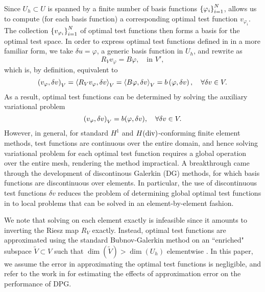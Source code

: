 Since $U_h \subset U$ is spanned by a finite number of basis functions $\LRc{\varphi_i}_{i=1}^N$,  allows us to compute (for each basis function) a corresponding optimal test function $v_{\varphi_i}$. The collection $\LRc{v_{\varphi_i}}_{i = 1}^N$ of optimal test functions then forms a basis for the optimal test space.  In order to express optimal test functions defined in  in a more familiar form, we take  $\delta u = \varphi$, a generic basis function in $U_h$, and rewrite  as
\[
R_Vv_{\varphi} = B\varphi, \quad \text{in } V',
\]
which is, by definition, equivalent to
\[
\LRp{v_\varphi,\delta v}_V = \LRa{R_Vv_\varphi,\delta v}_{V}=
\LRa{B\varphi, \delta v}_V = b\LRp{\varphi,\delta v}, \quad
\forall \delta v \in V.
\]
As a result, optimal test functions can be determined by solving the auxiliary
variational problem
\begin{equation}
\eqnlab{optvVar}
\left(v_\varphi,\delta v\right)_V = b(\varphi,\delta v), \quad \forall
\delta v \in V.
\end{equation}
However, in general, for standard $H^1$ and $H({\rm div})$-conforming finite element methods, test functions are continuous over the entire domain, and hence solving variational problem  for each optimal test function requires a global operation over the entire mesh, rendering the method impractical. A breakthrough came through the development of
discontinous Galerkin (DG) methods, for which basis functions are
discontinuous over elements. In particular, the use of discontinuous
test functions $\delta v$ reduces the problem of determining global 
optimal test functions
in  to local problems that can be solved in an
element-by-element fashion.

We note that solving  on each element exactly is
infeasible since it amounts to inverting the Riesz map $R_V$ exactly.
Instead, optimal test functions are approximated using the standard
Bubnov-Galerkin method on an ``enriched" subspace $\tilde{V} \subset
V$ such that $\dim(\tilde{V}) > \dim(U_h)$ elementwise \cite{DPG1, DPG2}. In this
paper, we assume the error in approximating the optimal test functions
is negligible, and refer to the work in \cite{practicalDPG} for
estimating the effects of approximation error on the performance of DPG.

